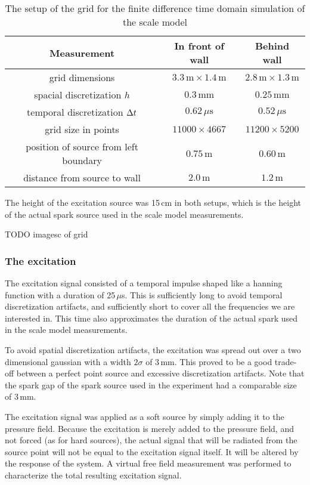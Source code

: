 \begin{table}[htb]
\begin{center}
\caption{The setup of the grid for the finite difference time domain simulation of the scale model\label{gridSetup}}
\begin{tabular}{c|c|c}
Measurement&	In front of wall&	Behind wall\\\hline
grid dimensions&
	$3.3\,\mathrm{m} \times 1.4\,\mathrm{m}$&
	$2.8\,\mathrm{m} \times 1.3\,\mathrm{m}$\\
spacial discretization $h$&
	$0.3\,\mathrm{mm}$&
	$0.25\,\mathrm{mm}$\\
temporal discretization $\Delta t$&
	$0.62\,\mu\mathrm{s}$&
	$0.52\,\mu\mathrm{s}$\\
grid size in points&
	$11000 \times 4667$&
	$11200 \times 5200$\\
position of source from left boundary&
	$0.75\,\mathrm{m}$&
	$0.60\,\mathrm{m}$\\
distance from source to wall&
	$2.0\,\mathrm{m}$&
	$1.2\,\mathrm{m}$\\
\end{tabular}
\end{center}
\end{table}

The height of the excitation source was 15\,cm in both setups, which is the height of the actual spark source used in the scale model measurements.

TODO imagesc of grid

\subsubsection*{The excitation}
The excitation signal consisted of a temporal impulse shaped like a hanning function with a duration of 25\,$\mu$s. This is sufficiently long to avoid temporal discretization artifacts, and sufficiently short to cover all the frequencies we are interested in. This time also approximates the duration of the actual spark used in the scale model measurements.

To avoid spatial discretization artifacts, the excitation was spread out over a two dimensional gaussian with a width $2\sigma$ of 3\,mm. This proved to be a good trade-off between a perfect point source and excessive discretization artifacts. Note that the spark gap of the spark source used in the experiment had a comparable size of 3\,mm.

The excitation signal was applied as a soft 
source\cite{soft-hard-source} by simply adding it to the 
pressure field. Because the excitation is merely added to the pressure 
field, and not forced (as for hard sources), the actual signal that will be 
radiated from the source point will not be equal to the excitation signal 
itself. It will be altered by the response of the system. A virtual free 
field measurement was performed to characterize the total resulting 
excitation signal.

